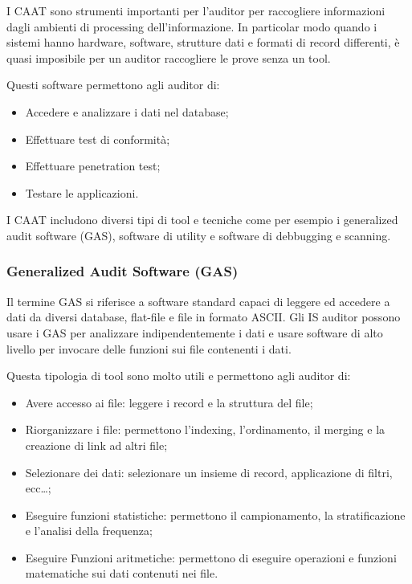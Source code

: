 I CAAT sono strumenti importanti per l'auditor per raccogliere
informazioni dagli ambienti di processing dell'informazione.
In particolar modo quando i sistemi hanno hardware, software, strutture
dati e formati di record differenti, è quasi imposibile per un auditor
raccogliere le prove senza un tool.

Questi software permettono agli auditor di:
\begin{itemize}
  \item Accedere e analizzare i dati nel database;
  \item Effettuare test di conformità;
  \item Effettuare penetration test;
  \item Testare le applicazioni.
\end{itemize}

I CAAT includono diversi tipi di tool e tecniche come per esempio
i generalized audit software (GAS), software di utility e
software di debbugging e scanning.

\subsubsection{Generalized Audit Software (GAS)}
Il termine GAS si riferisce a software standard capaci di leggere
ed accedere a dati da diversi database, flat-file e file in formato
ASCII. Gli IS auditor possono usare i GAS per analizzare indipendentemente
i dati e usare software di alto livello per invocare delle funzioni
sui file contenenti i dati.

Questa tipologia di tool sono molto utili e permettono agli auditor di:
\begin{itemize}
  \item Avere accesso ai file: leggere i record e la struttura del file;
  \item Riorganizzare i file: permettono l'indexing, l'ordinamento,
  il merging e la creazione di link ad altri file;
  \item Selezionare dei dati: selezionare un insieme di record,
  applicazione di filtri, ecc\dots;
  \item Eseguire funzioni statistiche: permettono il campionamento, 
  la stratificazione e l'analisi della frequenza;
  \item Eseguire Funzioni aritmetiche: permettono di eseguire operazioni e 
  funzioni matematiche sui dati contenuti nei file.
\end{itemize}



